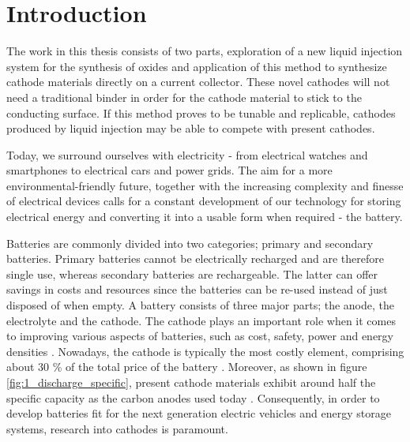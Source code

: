 \documentclass[Main/main.tex]{subfiles}
\begin{document}
\chapter{Introduction}



The work in this thesis consists of two parts, exploration of a new liquid injection system for the synthesis of oxides and application of this method to synthesize cathode materials directly on a current collector. These novel cathodes will not need a traditional binder in order for the cathode material to stick to the conducting surface. If this method proves to be tunable and replicable, cathodes produced by liquid injection may be able to compete with present cathodes.

Today, we surround ourselves with electricity - from electrical watches and smartphones to electrical cars and power grids. The aim for a more environmental-friendly future, together with the increasing complexity and finesse of electrical devices calls for a constant development of our technology for storing electrical energy and converting it into a usable form when required - the battery.

Batteries are commonly divided into two categories; primary and secondary batteries. Primary batteries cannot be electrically recharged and are therefore single use, whereas secondary batteries are rechargeable. The latter can offer savings in costs and resources since the batteries can be re-used instead of just disposed of when empty. A battery consists of three major parts; the anode, the electrolyte and the cathode. The cathode plays an important role when it comes to improving various aspects of batteries, such as cost, safety, power and energy densities \cite{gandrud}. Nowadays, the cathode is typically the most costly element, comprising about 30 \% of the total price of the battery \cite{costcath}. Moreover, as shown in figure \ref{fig:1_discharge_specific}, present cathode materials exhibit around half the specific capacity as the carbon anodes used today \cite{1_rev_liion}. Consequently, in order to develop batteries fit for the next generation electric vehicles and energy storage systems, research into cathodes is paramount.
\end{document}
